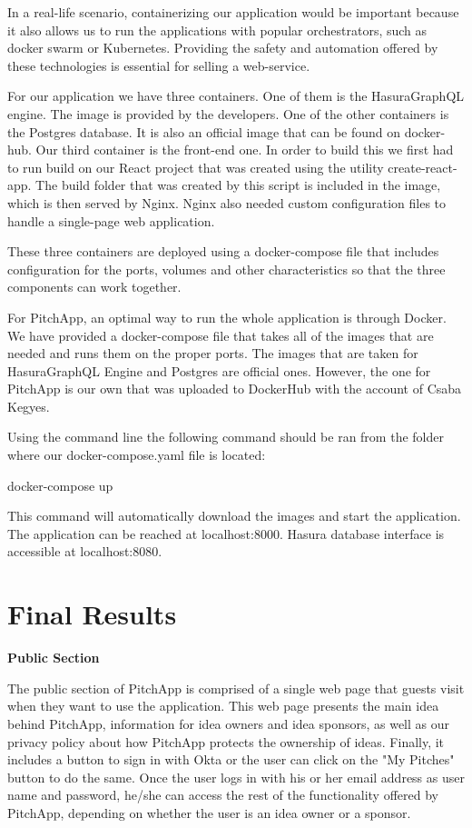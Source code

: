In a real-life scenario, containerizing our application would be important because it also allows us to run the applications with popular orchestrators, such as docker swarm or Kubernetes. Providing the safety and automation offered by these technologies is essential for selling a web-service.

For our application we have three containers. One of them is the HasuraGraphQL engine. The image is provided by the developers. One of the other containers is the Postgres database. It is also an official image that can be found on docker-hub. Our third container is the front-end one. In order to build this we first had to run build on our React project that was created using the utility create-react-app. The build folder that was created by this script is included in the image, which is then served by Nginx. Nginx also needed custom configuration files to handle a single-page web application.

These three containers are deployed using a docker-compose file that includes configuration for the ports, volumes and other characteristics so that the three components can work together.

For PitchApp, an optimal way to run the whole application is through Docker. We have provided a docker-compose file that takes all of the images that are needed and runs them on the proper ports. The images that are taken for HasuraGraphQL Engine and Postgres are official ones. However, the one for PitchApp is our own that was uploaded to DockerHub with the account of Csaba Kegyes.

Using the command line the following command should be ran from the folder where our docker-compose.yaml file is located:

docker-compose up

This command will automatically download the images and start the application. The application can be reached at localhost:8000. Hasura database interface is accessible at localhost:8080. 

\chapter{Final Results}


\textbf{Public Section}

The public section of PitchApp is comprised of a single web page that guests visit when they want to use the application. This web page presents the main idea behind PitchApp, information for idea owners and idea sponsors, as well as our privacy policy about how PitchApp protects the ownership of ideas. Finally, it includes a button to sign in with Okta or the user can click on the "My Pitches" button to do the same. Once the user logs in with his or her email address as user name and password, he/she can access the rest of the functionality offered by PitchApp, depending on whether the user is an idea owner or a sponsor.

